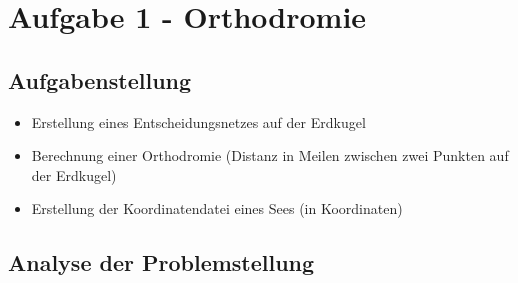 \section{Aufgabe 1 - Orthodromie}
\subsection{Aufgabenstellung}
\begin{itemize}
  \item Erstellung eines Entscheidungsnetzes auf der Erdkugel
  \item Berechnung einer Orthodromie (Distanz in Meilen zwischen zwei Punkten auf der Erdkugel)
  \item Erstellung der Koordinatendatei eines Sees (in Koordinaten)
\end{itemize}

\subsection{Analyse der Problemstellung}
